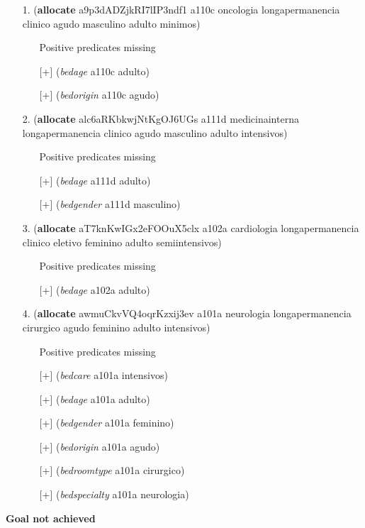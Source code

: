 \documentclass{article}
\begin{document}
\begin{itemize}
\item[1.] (\textbf{allocate} a9p3dADZjkRI7lIP3ndf1 a110c oncologia longapermanencia clinico agudo masculino adulto minimos)
\begin{itemize}
	\item[\textbullet] Positive predicates missing
	\item[\textbullet] [+] (\textit{bedage} a110c adulto)
	\item[\textbullet] [+] (\textit{bedorigin} a110c agudo)
\end{itemize}
\item[2.] (\textbf{allocate} alc6aRKbkwjNtKgOJ6UGs a111d medicinainterna longapermanencia clinico agudo masculino adulto intensivos)
\begin{itemize}
	\item[\textbullet] Positive predicates missing
	\item[\textbullet] [+] (\textit{bedage} a111d adulto)
	\item[\textbullet] [+] (\textit{bedgender} a111d masculino)
\end{itemize}
\item[3.] (\textbf{allocate} aT7knKwIGx2eFOOuX5clx a102a cardiologia longapermanencia clinico eletivo feminino adulto semiintensivos)
\begin{itemize}
	\item[\textbullet] Positive predicates missing
	\item[\textbullet] [+] (\textit{bedage} a102a adulto)
\end{itemize}
\item[4.] (\textbf{allocate} awmuCkvVQ4oqrKzxij3ev a101a neurologia longapermanencia cirurgico agudo feminino adulto intensivos)
\begin{itemize}
	\item[\textbullet] Positive predicates missing
	\item[\textbullet] [+] (\textit{bedcare} a101a intensivos)
	\item[\textbullet] [+] (\textit{bedage} a101a adulto)
	\item[\textbullet] [+] (\textit{bedgender} a101a feminino)
	\item[\textbullet] [+] (\textit{bedorigin} a101a agudo)
	\item[\textbullet] [+] (\textit{bedroomtype} a101a cirurgico)
	\item[\textbullet] [+] (\textit{bedspecialty} a101a neurologia)
\end{itemize}
\end{itemize}

\hline
\vspace{10pt}
\large \textbf{Goal not achieved}
\end{document}
